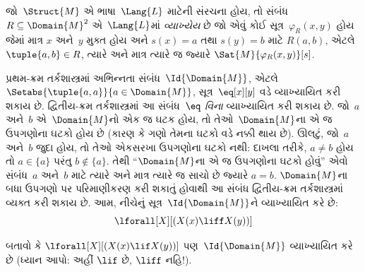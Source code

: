 \begin{defn}
જો~$\Struct{M}$ એ ભાષા~$\Lang{L}$ માટેની સંરચના હોય, તો
સંબંધ~$R \subseteq \Domain{M}^2$ એ~$\Lang{L}$માં \emph{વ્યાખ્યેય}
છે જો એવું કોઈ સૂત્ર~$\varphi_R(x, y)$ હોય જેમાં માત્ર $x$ અને~$y$
મુક્ત હોય અને $s(x) = a$ તથા $s(y) = b$ માટે $R(a, b)$, એટલે
$\tuple{a,b} \in R$, ત્યારે અને માત્ર ત્યારે જ જ્યારે
$\Sat{M}{\varphi_R(x, y)}[s]$.
\end{defn}

\begin{ex}
પ્રથમ-ક્રમ તર્કશાસ્ત્રમાં અભિન્નતા સંબંધ~$\Id{\Domain{M}}$, એટલે
$\Setabs{\tuple{a,a}}{a \in
  \Domain{M}}$, સૂત્ર~$\eq[x][y]$ વડે વ્યાખ્યાયિત કરી શકાય છે.
દ્વિતીય-ક્રમ તર્કશાસ્ત્રમાં આ સંબંધ~\emph{$\eq$ વિના} વ્યાખ્યાયિત
કરી શકાય છે. જો~$a$ અને~$b$ એ~$\Domain{M}$નો એક જ ઘટક
હોય, તો તેઓ~$\Domain{M}$ના એ જ ઉપગણોના ઘટકો હોય છે (કારણ
કે ગણો તેમના ઘટકો વડે નક્કી થાય છે). ઊલટું, જો~$a$ અને~$b$
જુદા હોય, તો તેઓ એકસરખા ઉપગણોના ઘટકો નથી: દાખલા તરીકે,
$a \neq b$ હોય તો $a \in \{a\}$ પરંતુ $b
\notin \{a\}$. તેથી ``$\Domain{M}$ના એ જ ઉપગણોના ઘટકો
હોવું'' એવો સંબંધ~$a$ અને~$b$ માટે ત્યારે અને માત્ર ત્યારે જ સાચો
છે જ્યારે $a = b$. $\Domain{M}$ના બધા ઉપગણો પર પરિમાણીકરણ કરી
શકાતું હોવાથી આ સંબંધ દ્વિતીય-ક્રમ તર્કશાસ્ત્રમાં વ્યક્ત કરી શકાય છે.
આમ, નીચેનું
સૂત્ર~$\Id{\Domain{M}}$ને વ્યાખ્યાયિત કરે છે:
\[
\lforall[X][(X(x) \liff X(y))]
\]
\end{ex}

\begin{prob}
બતાવો કે $\lforall[X][(X(x) \lif X(y))]$ પણ~$\Id{\Domain{M}}$
વ્યાખ્યાયિત કરે છે (ધ્યાન આપો: અહીં $\lif$ છે, $\liff$ નહિ!).
\end{prob}

